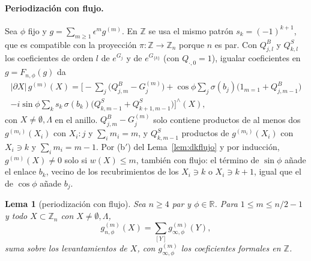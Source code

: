 \documentclass[11pt,a4paper]{article}
\newtheorem{lema}[teorema]{Lema}
\theoremstyle{remark}
\begin{document}
\paragraph{Periodización con flujo.} Sea $\phi$ fijo y $g=\sum_{m\ge1}\epsilon^mg^{(m)}$. En $\mathbb Z$ se
usa el mismo patrón $s_k=(-1)^{k+1}$, que es compatible con la proyección $\pi:\mathbb Z\to\mathbb Z_n$
porque $n$ es par. Con $Q^{B}_{j,l}$ y $Q^{S}_{k,l}$ los coeficientes de orden $l$ de $e^{G_j}$ y de
$e^{G_{\{k\}}}$ (con $Q_{\cdot,0}=1$), igualar coeficientes en $g=F_{n,\phi}(g)$ da
\begin{multline}\label{eq:recurrenciaflujo}
  |\partial X|\,g^{(m)}(X)=\Big[-\sum_j\big(Q^B_{j,m}-G_j^{(m)}\big)
  +\cos\phi\sum_j\sigma(b_j)\big(1_{m=1}+Q^B_{j,m-1}\big)\\
  -i\sin\phi\sum_ks_k\,\sigma(b_k)\big(Q^S_{k,m-1}+Q^S_{k+1,m-1}\big)\Big]^\wedge(X),
\end{multline}
con $X\ne\emptyset,\Lambda$ en el anillo. $Q^B_{j,m}-G^{(m)}_j$ solo contiene productos de al menos dos
$g^{(m_i)}(X_i)$ con $X_i:j$ y $\sum_im_i=m$, y $Q^S_{k,m-1}$ productos de $g^{(m_i)}(X_i)$ con $X_i\ni k$ y
$\sum_im_i=m-1$. Por (b$'$) del Lema~\ref{lem:dkflujo} y por inducción, $g^{(m)}(X)\ne0$ solo si
$w(X)\le m$, también con flujo: el término de $\sin\phi$ añade el enlace $b_k$, vecino de los
recubrimientos de los $X_i\ni k$ o $X_i\ni k{+}1$, igual que el de $\cos\phi$ añade $b_j$.

\begin{lema}[periodización con flujo]\label{lem:periodizacionflujo}
Sea $n\ge4$ par y $\phi\in\mathbb R$. Para $1\le m\le n/2-1$ y todo $X\subset\mathbb Z_n$ con $X\ne\emptyset,\Lambda$,
\[
  g_{n,\phi}^{(m)}(X)=\sum_{[Y]}g_{\infty,\phi}^{(m)}(Y),
\]
suma sobre los levantamientos de $X$, con $g_{\infty,\phi}^{(m)}$ los coeficientes formales en $\mathbb Z$.
\end{lema}
\end{document}
